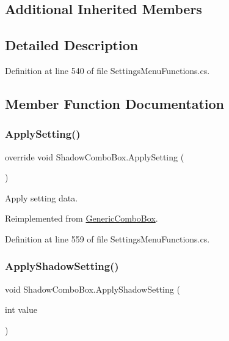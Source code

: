 \subsection*{Additional Inherited Members}


\subsection{Detailed Description}


Definition at line 540 of file Settings\+Menu\+Functions.\+cs.



\subsection{Member Function Documentation}
\mbox{\label{class_shadow_combo_box_a9289f25b57e2935f1b971ec9875218d8}} 
\subsubsection{\texorpdfstring{Apply\+Setting()}{ApplySetting()}}
{\footnotesize\ttfamily override void Shadow\+Combo\+Box.\+Apply\+Setting (\begin{DoxyParamCaption}{ }\end{DoxyParamCaption})\hspace{0.3cm}{\ttfamily [virtual]}}



Apply setting data. 



Reimplemented from \hyperlink{class_generic_combo_box_a5aced71f035bd463a4ebaaffe19ec547}{Generic\+Combo\+Box}.



Definition at line 559 of file Settings\+Menu\+Functions.\+cs.

\mbox{\label{class_shadow_combo_box_aa498ebcfff0a339d139a99216113f913}} 
\subsubsection{\texorpdfstring{Apply\+Shadow\+Setting()}{ApplyShadowSetting()}}
{\footnotesize\ttfamily void Shadow\+Combo\+Box.\+Apply\+Shadow\+Setting (\begin{DoxyParamCaption}\item[{int}]{value }\end{DoxyParamCaption})}




